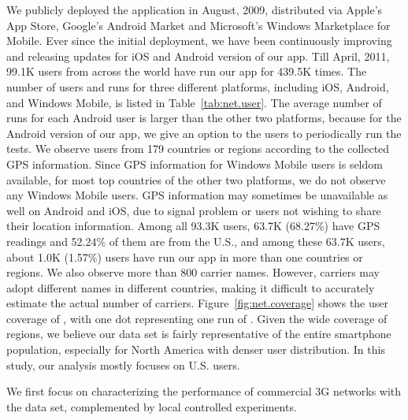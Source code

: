 We publicly deployed the \mobiperf application in August, 2009, distributed via Apple's App Store, Google's Android Market and Microsoft's Windows Marketplace for Mobile. Ever since the initial deployment, we have been continuously improving and releasing updates for iOS and Android version of our app. Till April, 2011, 99.1K users from across the world have run our app for 439.5K times. The number of users and runs for three different platforms, including iOS, Android, and Windows Mobile, is listed in Table~\ref{tab:net.user}. The average number of runs for each Android user is larger than the other two platforms, because for the Android version of our app, we give an option to the users to periodically run the tests. We observe users from 179 countries or regions according to the collected GPS information. Since GPS information for Windows Mobile users is seldom available, for most top countries of the other two platforms, we do not observe any Windows Mobile users. GPS information may sometimes be unavailable as well on Android and iOS, due to signal problem or users not wishing to share their location information. Among all 93.3K users, 63.7K (68.27\%) have GPS readings and 52.24\% of them are from the U.S., and among these 63.7K users, about 1.0K (1.57\%) users have run our app in more than one countries or regions. We also observe more than 800 carrier names. However, carriers may adopt different names in different countries, making it difficult to accurately estimate the actual number of carriers. Figure~\ref{fig:net.coverage} shows the user coverage of \mobiperf, with one dot representing one run of \mobiperf. Given the wide coverage of regions, we believe our data set is fairly representative of the entire smartphone population, especially for North America with denser user distribution. In this study, our analysis mostly focuses on U.S. users.


\label{sec:net.3g}
We first focus on characterizing the performance of commercial 3G networks with the \mobiperf data set, complemented by local controlled experiments.

